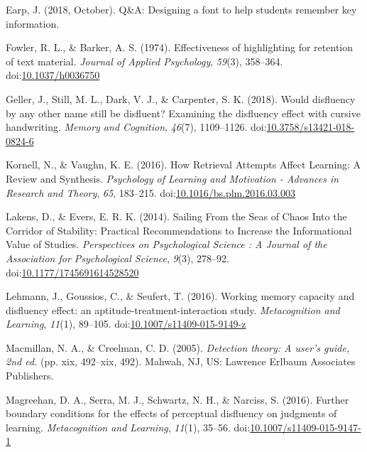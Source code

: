 \documentclass[jou]{apa6}
\begin{document}
\leavevmode\hypertarget{ref-Earp2018}{}%
Earp, J. (2018, October). Q\&A: Designing a font to help students remember key information.

\leavevmode\hypertarget{ref-Fowler1974}{}%
Fowler, R. L., \& Barker, A. S. (1974). Effectiveness of highlighting for retention of text material. \emph{Journal of Applied Psychology}, \emph{59}(3), 358--364. doi:\href{https://doi.org/10.1037/h0036750}{10.1037/h0036750}

\leavevmode\hypertarget{ref-Geller2018}{}%
Geller, J., Still, M. L., Dark, V. J., \& Carpenter, S. K. (2018). Would disfluency by any other name still be disfluent? Examining the disfluency effect with cursive handwriting. \emph{Memory and Cognition}, \emph{46}(7), 1109--1126. doi:\href{https://doi.org/10.3758/s13421-018-0824-6}{10.3758/s13421-018-0824-6}

\leavevmode\hypertarget{ref-Kornell2016}{}%
Kornell, N., \& Vaughn, K. E. (2016). How Retrieval Attempts Affect Learning: A Review and Synthesis. \emph{Psychology of Learning and Motivation - Advances in Research and Theory}, \emph{65}, 183--215. doi:\href{https://doi.org/10.1016/bs.plm.2016.03.003}{10.1016/bs.plm.2016.03.003}

\leavevmode\hypertarget{ref-Lakens2014}{}%
Lakens, D., \& Evers, E. R. K. (2014). Sailing From the Seas of Chaos Into the Corridor of Stability: Practical Recommendations to Increase the Informational Value of Studies. \emph{Perspectives on Psychological Science : A Journal of the Association for Psychological Science}, \emph{9}(3), 278--92. doi:\href{https://doi.org/10.1177/1745691614528520}{10.1177/1745691614528520}

\leavevmode\hypertarget{ref-Lehmann2016}{}%
Lehmann, J., Goussios, C., \& Seufert, T. (2016). Working memory capacity and disfluency effect: an aptitude-treatment-interaction study. \emph{Metacognition and Learning}, \emph{11}(1), 89--105. doi:\href{https://doi.org/10.1007/s11409-015-9149-z}{10.1007/s11409-015-9149-z}

\leavevmode\hypertarget{ref-Macmillan2005}{}%
Macmillan, N. A., \& Creelman, C. D. (2005). \emph{Detection theory: A user's guide, 2nd ed.} (pp. xix, 492--xix, 492). Mahwah, NJ, US: Lawrence Erlbaum Associates Publishers.

\leavevmode\hypertarget{ref-Magreehan2016}{}%
Magreehan, D. A., Serra, M. J., Schwartz, N. H., \& Narciss, S. (2016). Further boundary conditions for the effects of perceptual disfluency on judgments of learning. \emph{Metacognition and Learning}, \emph{11}(1), 35--56. doi:\href{https://doi.org/10.1007/s11409-015-9147-1}{10.1007/s11409-015-9147-1}
\end{document}
